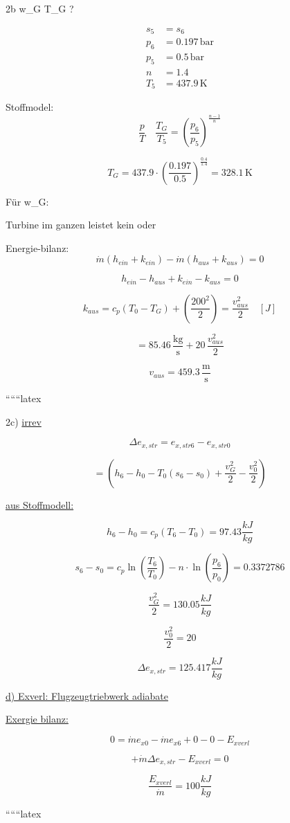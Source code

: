2b \quad w_G \quad T_G ?

\begin{align*}
s_5 &= s_6 \\
p_6 &= 0.197 \, \text{bar} \\
p_5 &= 0.5 \, \text{bar} \\
n &= 1.4 \\
T_5 &= 437.9 \, \text{K}
\end{align*}

Stoffmodel:
\[
\frac{p}{T} \quad \frac{T_G}{T_5} = \left( \frac{p_6}{p_5} \right)^{\frac{n-1}{n}}
\]

\[
T_G = 437.9 \cdot \left( \frac{0.197}{0.5} \right)^{\frac{0.4}{1.4}} = 328.1 \, \text{K}
\]

Für \quad w_G:

Turbine im ganzen \quad leistet \quad kein \quad {} \quad oder \quad {}

Energie-bilanz:
\[
\dot{m} \left( h_{ein} + k_{ein} \right) - \dot{m} \left( h_{aus} + k_{aus} \right) = 0
\]

\[
h_{ein} - h_{aus} + k_{ein} - k_{aus} = 0
\]

\[
k_{aus} = c_p \left( T_0 - T_G \right) + \left( \frac{200^2}{2} \right) = \frac{v_{aus}^2}{2} \quad [J]
\]

\[
= 85.46 \, \frac{\text{kg}}{\text{s}} + 20 \, \frac{v_{aus}^2}{2}
\]

\[
v_{aus} = 459.3 \, \frac{\text{m}}{\text{s}}
\]

``````latex


2c) \underline{irrev}

\[
\Delta e_{x,str} = e_{x,str6} - e_{x,str0}
\]

\[
= \left( h_6 - h_0 - T_0 (s_6 - s_0) + \frac{v_{G}^2}{2} - \frac{v_{0}^2}{2} \right)
\]

\underline{aus Stoffmodell:}

\[
h_6 - h_0 = c_p \left( T_6 - T_0 \right) = 97.43 \frac{kJ}{kg}
\]

\[
s_6 - s_0 = c_p \ln \left( \frac{T_6}{T_0} \right) - n \cdot \ln \left( \frac{p_6}{p_0} \right) = 0.3372786
\]

\[
\frac{v_{G}^2}{2} = 130.05 \frac{kJ}{kg}
\]

\[
\frac{v_{0}^2}{2} = 20
\]

\[
\Delta e_{x,str} = 125.417 \frac{kJ}{kg}
\]

\underline{d) Exverl: Flugzeugtriebwerk adiabate}

\underline{Exergie bilanz:}

\[
0 = \dot{m} e_{x0} - \dot{m} e_{x6} + 0 - 0 - E_{xverl}
\]

\[
+ \dot{m} \Delta e_{x,str} - E_{xverl} = 0
\]

\[
\frac{E_{xverl}}{\dot{m}} = 100 \frac{kJ}{kg}
\]

``````latex


